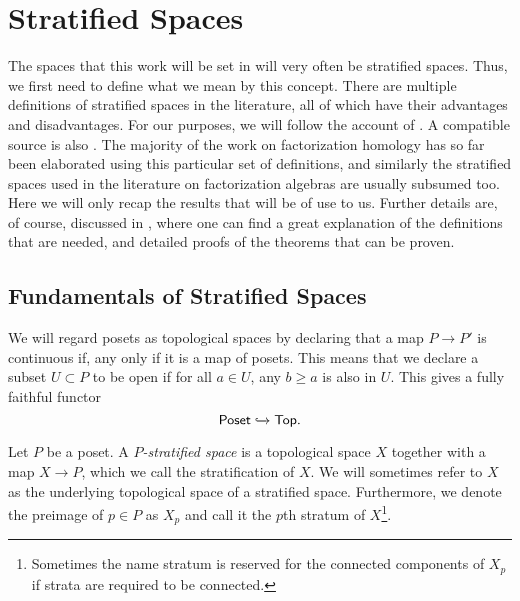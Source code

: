 \documentclass[../text]{subfiles}
\begin{document}
\section{Stratified Spaces}\label{ch:strat_spaces}

The spaces that this work will be set in will very often be stratified spaces. Thus, we first need to define what we mean by this concept. There are multiple definitions of stratified spaces in the literature, all of which have their advantages and disadvantages. For our purposes, we will follow the account of \cite{aft_localstrut}. A compatible source is also \cite[sec.A.5]{lurie_ha}. The majority of the work on factorization homology has so far been elaborated using this particular set of definitions, and similarly the stratified spaces used in the literature on factorization algebras are usually subsumed too. Here we will only recap the results that will be of use to us. Further details are, of course, discussed in \cite{aft_localstrut}, where one can find a great explanation of the definitions that are needed, and detailed proofs of the theorems that can be proven.

\subsection{Fundamentals of Stratified Spaces}

\begin{definition}
    We will regard posets as topological spaces by declaring that a map $P \rightarrow P'$ is continuous if, any only if it is a map of posets. This means that we declare a subset $U \subset P$ to be open if for all $a \in U$, any $b \geq a$ is also in $U$. This gives a fully faithful functor
    \begin{equation}
        \mathsf{Poset} \xhookrightarrow{} \mathsf{Top}.
    \end{equation} 
\end{definition}

\begin{definition}
    Let $P$ be a poset. A \emph{$P$-stratified space} is a topological space $X$ together with a map $X \rightarrow P$, which we call the stratification of $X$. We will sometimes refer to $X$ as the underlying topological space of a stratified space. Furthermore, we denote the preimage of $p \in P$ as $X_p$ and call it the $p$th stratum of $X$\footnote{Sometimes the name stratum is reserved for the connected components of $X_p$ if strata are required to be connected.}.
\end{definition}
\end{document}
